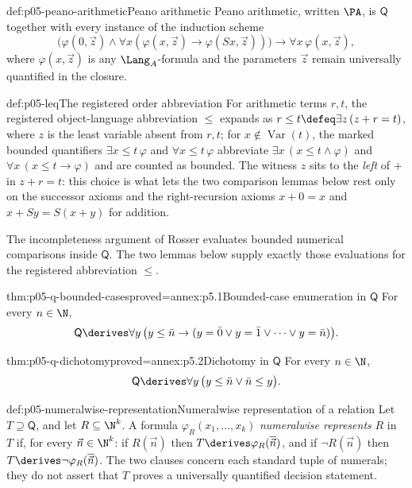 

\begin{hbdefinition}{def:p05-peano-arithmetic}{Peano arithmetic}
Peano arithmetic, written \(\PA\), is \(\mathsf Q\) together with every
instance of the induction scheme
\[
  \bigl(\varphi(0,\vec z)\land
  \forall x(\varphi(x,\vec z)\to\varphi(Sx,\vec z))\bigr)
  \to\forall x\,\varphi(x,\vec z),
\]
where \(\varphi(x,\vec z)\) is any \(\Lang_A\)-formula and the parameters
\(\vec z\) remain universally quantified in the closure.
\end{hbdefinition}

\begin{hbconvention}{def:p05-leq}{The registered order abbreviation}
For arithmetic terms \(r,t\), the registered object-language abbreviation
\(\leq\) expands as \(r\leq t\defeq\exists z\,(z+r=t)\), where \(z\) is the
least variable absent from \(r,t\); for \(x\notin\operatorname{Var}(t)\),
the marked bounded quantifiers
\(\exists x\leq t\,\varphi\) and \(\forall x\leq t\,\varphi\) abbreviate
\(\exists x\,(x\leq t\land\varphi)\) and
\(\forall x\,(x\leq t\to\varphi)\) and are counted as bounded.  The
witness \(z\) sits to the \emph{left} of \(+\) in \(z+r=t\): this choice
is what lets the two comparison lemmas below rest only on the successor
axioms and the right-recursion axioms \(x+0=x\) and \(x+Sy=S(x+y)\) for
addition.
\end{hbconvention}

The incompleteness argument of Rosser evaluates bounded numerical
comparisons inside \(\mathsf Q\).  The two lemmas below supply exactly
those evaluations for the registered abbreviation \(\leq\).

\begin{hblemma}{thm:p05-q-bounded-cases}{proved=annex:p5.1}{Bounded-case enumeration in \(\mathsf Q\)}
For every \(n\in\N\),
\[
  \mathsf Q\derives\forall y\,\bigl(y\leq\bar n\to
  (y=\bar0\lor y=\bar1\lor\dots\lor y=\bar n)\bigr).
\]
\end{hblemma}

\begin{hblemma}{thm:p05-q-dichotomy}{proved=annex:p5.2}{Dichotomy in \(\mathsf Q\)}
For every \(n\in\N\),
\[
  \mathsf Q\derives\forall y\,
  \bigl(y\leq\bar n\lor\bar n\leq y\bigr).
\]
\end{hblemma}

\begin{hbdefinition}{def:p05-numeralwise-representation}{Numeralwise representation of a relation}
Let \(T\supseteq\mathsf Q\), and let \(R\subseteq\N^k\).  A formula
\(\varphi_R(x_1,\ldots,x_k)\) \emph{numeralwise represents} \(R\) in \(T\)
if, for every \(\vec n\in\N^k\): if \(R(\vec n)\) then
\(T\derives\varphi_R(\overline{\vec n})\), and if \(\neg R(\vec n)\) then
\(T\derives\neg\varphi_R(\overline{\vec n})\).  The two clauses concern each
standard tuple of numerals; they do not assert that \(T\) proves a
universally quantified decision statement.
\end{hbdefinition}


